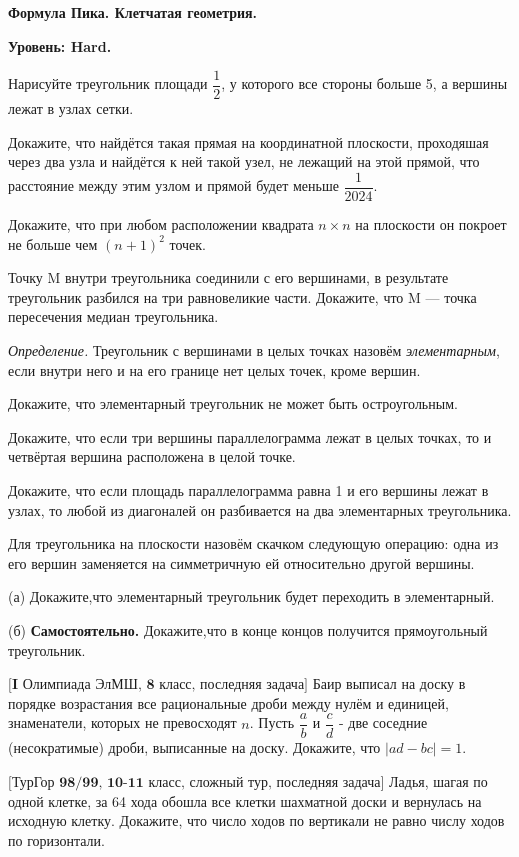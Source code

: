 \hspace{3mm}

\centerline{\bf \Huge  Формула Пика. Клетчатая геометрия.}
\centerline{\bf \Huge Уровень: Hard.}

\begin{flushright}
    \scriptsize{}
\end{flushright}


Нарисуйте треугольник площади $\dfrac{1}{2}$, у которого все стороны больше 5, а вершины лежат в узлах сетки.

Докажите, что найдётся такая прямая на координатной плоскости, проходяшая через два узла и найдётся к ней такой узел, не лежащий на этой прямой, что расстояние между этим узлом и прямой будет меньше $\dfrac{1}{2024}$.

Докажите, что при любом расположении квадрата $n\times n$ на плоскости он покроет не больше чем $(n+1)^2$ точек.

Точку M внутри треугольника соединили с его вершинами, в результате треугольник разбился на три равновеликие части. Докажите, что M — точка пересечения медиан треугольника.

\textit{Определение.} 
Треугольник с вершинами в целых точках назовём \textit{элементарным}, если внутри него и на его границе нет целых точек, кроме вершин.

Докажите, что элементарный треугольник не может быть остроугольным.

Докажите, что если три вершины параллелограмма лежат в целых точках, то и четвёртая вершина расположена в целой точке.

Докажите, что если площадь параллелограмма равна 1 и его вершины лежат в узлах, то любой из диагоналей он разбивается на два элементарных треугольника. 

Для треугольника на плоскости назовём скачком следующую операцию: одна из его вершин заменяется на симметричную ей относительно другой вершины.

(а) Докажите,что элементарный треугольник будет переходить в элементарный.

(б) \textbf{Самостоятельно.} Докажите,что в конце концов получится прямоугольный треугольник.


$\bigl[\textbf{I Олимпиада ЭлМШ, 8 класс, последняя задача}\bigr]$
Баир выписал на доску в порядке возрастания все рациональные дроби между нулём и единицей, знаменатели, которых не превосходят $n$. Пусть $\dfrac{a}{b}$ и $\dfrac{c}{d}$ - две соседние (несократимые) дроби, выписанные на доску. Докажите, что $|ad - bc| = 1$.

$\bigl[\textbf{ТурГор 98/99, 10-11 класс, сложный тур, последняя задача}\bigr]$
Ладья, шагая по одной клетке, за 64 хода обошла все клетки шахматной доски и вернулась на исходную клетку. Докажите, что число ходов по вертикали не равно числу ходов по горизонтали.
